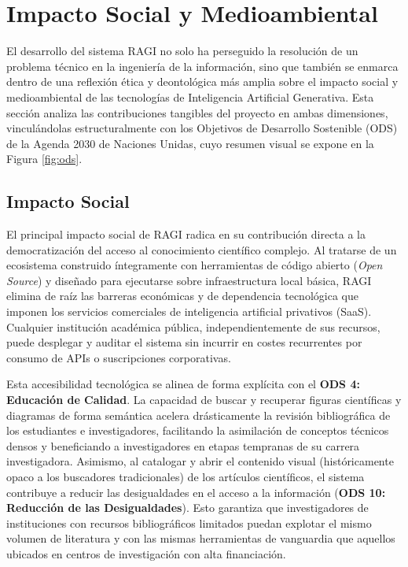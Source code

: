 \documentclass[a4paper]{report}
\begin{document}
\begingroup
\let\clearpage\relax %
\let\newpage\relax   %
\vspace{0.5cm}       %

\section{Impacto Social y Medioambiental}
\label{sec:impacto_social}
\endgroup

El desarrollo del sistema RAGI no solo ha perseguido la resolución de un problema técnico en la ingeniería de la información, sino que también se enmarca dentro de una reflexión ética y deontológica más amplia sobre el impacto social y medioambiental de las tecnologías de Inteligencia Artificial Generativa. Esta sección analiza las contribuciones tangibles del proyecto en ambas dimensiones, vinculándolas estructuralmente con los Objetivos de Desarrollo Sostenible (ODS) de la Agenda 2030 de Naciones Unidas, cuyo resumen visual se expone en la Figura \ref{fig:ods}.

\subsection{Impacto Social}

El principal impacto social de RAGI radica en su contribución directa a la democratización del acceso al conocimiento científico complejo. Al tratarse de un ecosistema construido íntegramente con herramientas de código abierto (\textit{Open Source}) y diseñado para ejecutarse sobre infraestructura local básica, RAGI elimina de raíz las barreras económicas y de dependencia tecnológica que imponen los servicios comerciales de inteligencia artificial privativos (SaaS). Cualquier institución académica pública, independientemente de sus recursos, puede desplegar y auditar el sistema sin incurrir en costes recurrentes por consumo de APIs o suscripciones corporativas.

Esta accesibilidad tecnológica se alinea de forma explícita con el \textbf{ODS 4: Educación de Calidad}. La capacidad de buscar y recuperar figuras científicas y diagramas de forma semántica acelera drásticamente la revisión bibliográfica de los estudiantes e investigadores, facilitando la asimilación de conceptos técnicos densos y beneficiando a investigadores en etapas tempranas de su carrera investigadora. Asimismo, al catalogar y abrir el contenido visual (históricamente opaco a los buscadores tradicionales) de los artículos científicos, el sistema contribuye a reducir las desigualdades en el acceso a la información (\textbf{ODS 10: Reducción de las Desigualdades}). Esto garantiza que investigadores de instituciones con recursos bibliográficos limitados puedan explotar el mismo volumen de literatura y con las mismas herramientas de vanguardia que aquellos ubicados en centros de investigación con alta financiación.
\end{document}
